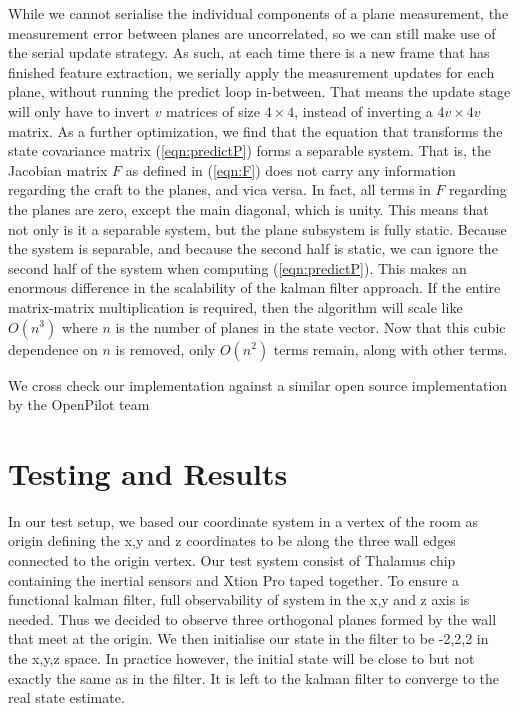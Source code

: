 \documentclass[]{article}
\begin{document}
{While we cannot serialise the individual components of a plane measurement, the measurement error between planes are uncorrelated, so we can still make use of the serial update strategy. As such, at each time there is a new frame that has finished feature extraction, we serially apply the measurement updates for each plane, without running the predict loop in-between.
That means the update stage will only have to invert $v$ matrices of size $4\times4$, instead of inverting a $4v \times 4v$ matrix. 
As a further optimization, we find that the equation that transforms the state covariance matrix (\ref{eqn:predictP}) forms a separable system. That is, the Jacobian matrix $F$ as defined in (\ref{eqn:F}) does not carry any information regarding the craft to the planes, and vica versa.
In fact, all terms in $F$ regarding the planes are zero, except the main diagonal, which is unity. This means that not only is it a separable system, but the plane subsystem is fully static.
Because the system is separable, and because the second half is static, we can ignore the second half of the system when computing (\ref{eqn:predictP}).
This makes an enormous difference in the scalability of the kalman filter approach. If the entire matrix-matrix multiplication is required, then the algorithm will scale like $O(n^3)$ where $n$ is the number of planes in the state vector. Now that this cubic dependence on $n$ is removed, only $O(n^2)$ terms remain, along with other terms.

	We cross check our implementation against a similar open source implementation by the OpenPilot team %



\section{Testing and Results} %
\label{sub:testing_kalman}
In our test setup, we based our coordinate system in a vertex of the room as origin defining the x,y and z coordinates to be along the three wall edges connected to the origin vertex. Our test system consist of Thalamus chip containing the inertial sensors and Xtion Pro taped together. To ensure a functional kalman filter, full observability of system in the x,y and z axis is needed. Thus we decided to observe three orthogonal planes formed by the wall that meet at the origin. We then initialise our state in the filter to be -2,2,2 in the x,y,z space. In practice however, the initial state will be close to but not exactly the same as in the filter. It is left to the kalman filter to converge to the real state estimate.

}
\end{document}

